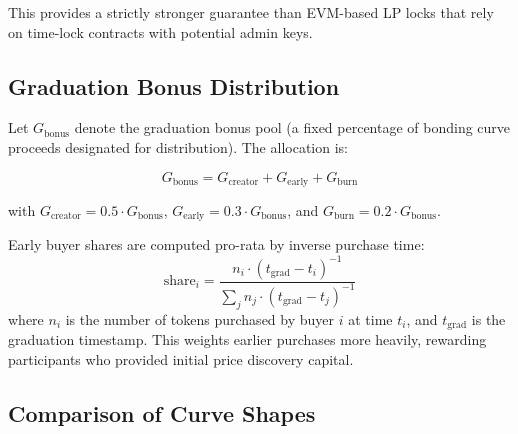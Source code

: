 This provides a strictly stronger guarantee than EVM-based LP locks that rely
on time-lock contracts with potential admin keys.

\subsection{Graduation Bonus Distribution}
\label{subsec:grad-bonus}

Let $G_{\text{bonus}}$ denote the graduation bonus pool (a fixed percentage of
bonding curve proceeds designated for distribution). The allocation is:

\begin{equation}
  G_{\text{bonus}} = G_{\text{creator}} + G_{\text{early}} + G_{\text{burn}}
  \label{eq:grad-bonus}
\end{equation}

with $G_{\text{creator}} = 0.5 \cdot G_{\text{bonus}}$, $G_{\text{early}} =
0.3 \cdot G_{\text{bonus}}$, and $G_{\text{burn}} = 0.2 \cdot G_{\text{bonus}}$.

Early buyer shares are computed pro-rata by inverse purchase time:
\begin{equation}
  \text{share}_i = \frac{n_i \cdot (t_{\text{grad}} - t_i)^{-1}}{\sum_j n_j \cdot (t_{\text{grad}} - t_j)^{-1}}
  \label{eq:early-share}
\end{equation}
where $n_i$ is the number of tokens purchased by buyer $i$ at time $t_i$, and
$t_{\text{grad}}$ is the graduation timestamp. This weights earlier purchases
more heavily, rewarding participants who provided initial price discovery
capital.

\subsection{Comparison of Curve Shapes}
\label{subsec:curve-comparison}

